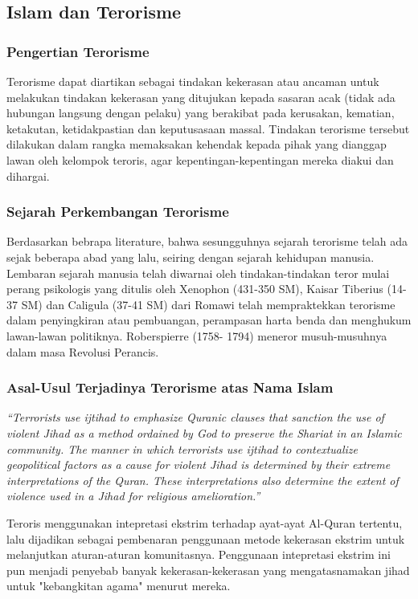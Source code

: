 \documentclass[a4paper,12 pt]{article}%
\begin{document}
\subsection{Islam dan Terorisme}
\subsubsection{Pengertian Terorisme}
Terorisme dapat diartikan sebagai tindakan kekerasan atau ancaman untuk melakukan tindakan 
kekerasan yang ditujukan kepada sasaran acak (tidak ada hubungan langsung dengan pelaku) yang 
berakibat pada kerusakan, kematian, ketakutan, ketidakpastian dan keputusasaan massal. Tindakan 
terorisme tersebut dilakukan dalam rangka memaksakan kehendak kepada pihak yang dianggap lawan 
oleh kelompok teroris, agar kepentingan-kepentingan mereka diakui dan dihargai\parencite{mustofa}.
\subsubsection{Sejarah Perkembangan Terorisme}
Berdasarkan bebrapa literature, bahwa sesungguhnya sejarah terorisme telah ada sejak beberapa 
abad yang lalu, seiring dengan sejarah kehidupan manusia. Lembaran sejarah manusia telah diwarnai 
oleh tindakan-tindakan teror mulai perang psikologis yang ditulis oleh Xenophon (431-350 SM), 
Kaisar Tiberius (14-37 SM) dan Caligula (37-41 SM) dari Romawi telah mempraktekkan terorisme 
dalam penyingkiran atau pembuangan, perampasan harta benda dan menghukum lawan-lawan politiknya. 
Roberspierre (1758- 1794) meneror musuh-musuhnya dalam masa Revolusi Perancis\parencite{junaid}.
\subsubsection{Asal-Usul Terjadinya Terorisme atas Nama Islam}
\textit{``Terrorists use \textit{ijtihad} to emphasize Quranic clauses that sanction the use of 
violent Jihad as a method ordained by God to preserve the \textit{Shariat} in an Islamic community. 
The manner in which terrorists use \textit{ijtihad} to contextualize geopolitical factors as a 
cause for violent Jihad is determined by their extreme interpretations of the Quran. These 
interpretations also determine the extent of violence used in a Jihad for religious amelioration.''}
\parencite{venkat}

Teroris menggunakan intepretasi ekstrim terhadap ayat-ayat Al-Quran tertentu, lalu dijadikan sebagai 
pembenaran penggunaan metode kekerasan ekstrim untuk melanjutkan aturan-aturan komunitasnya.
Penggunaan intepretasi ekstrim ini pun menjadi penyebab banyak kekerasan-kekerasan yang 
mengatasnamakan jihad untuk "kebangkitan agama" menurut mereka. 
\clearpage
\end{document}
